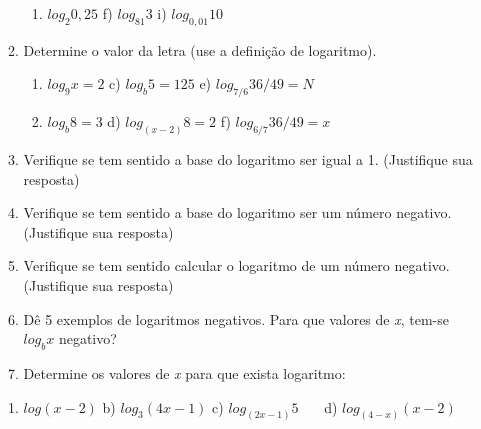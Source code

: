 \documentclass[12pt]{article}
\begin{document}
\begin{enumerate}[label*={\fontsize{14pt}{14pt}\selectfont \textbf{\arabic*.}}]
\begin{enumerate}
\begin{enumerate}
	\item  \( log_{2}0,25 \) \tab \tab \tab f)  \( log_{81}3 \) \tab \tab i)  \( log_{0,01}10 \) 
\end{enumerate}\par


\vspace{\baselineskip}
	\item Determine o valor da letra (use a definição de logaritmo). \par

\begin{enumerate}
	\item  \( log_{9}x=2 \) \tab \tab c)  \( log_{b}5=125 \) \tab \tab e)  \( log_{7/6}36/49=N \) \par

	\item  \( log_{b}8=3 \) \tab \tab d)  \( log_{ \left( x-2 \right) }8=2 \) \tab \tab f)  \( log_{6/7}36/49=x \) 
\end{enumerate}\par


\vspace{\baselineskip}
	\item Verifique se tem sentido a base do logaritmo ser igual a 1. (Justifique sua resposta)\par


\vspace{\baselineskip}
	\item Verifique se tem sentido a base do logaritmo ser um número negativo. (Justifique sua resposta)\par


\vspace{\baselineskip}
	\item Verifique se tem sentido calcular o logaritmo de um número negativo. (Justifique sua resposta)\par

	\item Dê 5 exemplos de logaritmos negativos. Para que valores de \textit{x}, tem-se \(  log_{b}x \)  negativo?\par


\vspace{\baselineskip}
	\item Determine os valores de \textit{x} para que exista logaritmo:
\end{enumerate}\par

\begin{enumerate}
	\item  \( log \left( x-2 \right)  \) \tab b)  \( log_{3} \left( 4x-1 \right)  \) \tab c)  \( log_{ \left( 2x-1 \right) }5 \) \tab \ \ \  d)  \( log_{ \left( 4-x \right) } \left( x-2 \right)  \) \tab 
\end{enumerate}\par


\end{enumerate}
\end{document}
